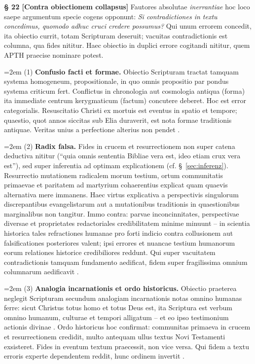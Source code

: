 \documentclass[11pt,a4paper]{article}
\makeatletter
\newcommand{\apth}{{\apthfont APTH}\hspace{0.15em}\xspace}
\newcommand{\subpar}[1]{%
  \begingroup
  \leftskip=2em %
  \noindent#1\par
  \endgroup
}
\newcommand{\apthsec}[3]{%
  \phantomsection%
  \def\@currentlabel{#1}%
  \label{sec:#3}%
  \textbf{§ #1 [#2]}%
}
\makeatother
\begin{document}
\apthsec{22}{Contra obiectionem collapsus}{kollaps} Fautores absolutae \textit{inerrantiae} hoc loco saepe argumentum specie cogens opponunt: \textit{Si contradictiones in textu concedimus, quomodo adhuc cruci credere possumus?} Qui unum errorem concedit, ita obiectio currit, totam Scripturam deseruit; vacuitas contradictionis est columna, qua fides nititur. Haec obiectio in duplici errore cogitandi nititur, quem \apth praecise nominare potest.

\subpar{(1) \textbf{Confusio facti et formae.} Obiectio Scripturam tractat tamquam systema homogeneum, propositionale, in quo omnis propositio par pondus systema criticum fert. Conflictus in chronologia aut cosmologia antiqua (forma) ita immediate centrum kerygmaticum (factum) concutere deberet. Hoc est error categorialis. Resuscitatio Christi ex mortuis est eventus in spatio et tempore; quaestio, quot annos siccitas sub Elia duraverit, est nota formae traditionis antiquae. Veritas unius a perfectione alterius non pendet \citep{wright2005}.}

\subpar{(2) \textbf{Radix falsa.} Fides in crucem et resurrectionem non super catena deductiva nititur (``quia omnis sententia Bibliae vera est, ideo etiam crux vera est''), sed super inferentia ad optimam explicationem (cf. §~\ref{sec:inferenz}). Resurrectio mutationem radicalem morum testium, ortum communitatis primaevae et paritatem ad martyrium cohaerentius explicat quam quaevis alternativa mere immanens. Haec virtus explicativa a perspectivis singulorum discrepantibus evangelistarum aut a mutationibus traditionis in quaestionibus marginalibus non tangitur. Immo contra: parvae inconcinnitates, perspectivae diversae et proprietates redactoriales credibilitatem minime minuunt -- in scientia historica tales refractiones humanae pro forti indicio contra collusionem aut falsificationes posteriores valent; ipsi errores et nuancae testium humanorum eorum relationes historice credibiliores reddunt. Qui super vacuitatem contradictionis tamquam fundamento aedificat, fidem super fragilissima omnium columnarum aedificavit \citep{bauckham2006}.}

\subpar{(3) \textbf{Analogia incarnationis et ordo historicus.} Obiectio praeterea neglegit Scripturam secundum analogiam incarnationis notas omnino humanas ferre: sicut Christus totus homo et totus Deus est, ita Scriptura est verbum omnino humanum, culturae et tempori alligatum -- et eo ipso testimonium actionis divinae \citep{enns2005}. Ordo historicus hoc confirmat: communitas primaeva in crucem et resurrectionem credidit, multo antequam ullus textus Novi Testamenti exsisteret. Fides in eventum textum praecessit, non vice versa. Qui fidem a textu erroris experte dependentem reddit, hunc ordinem invertit \citep{sparks2008}.}
\end{document}
